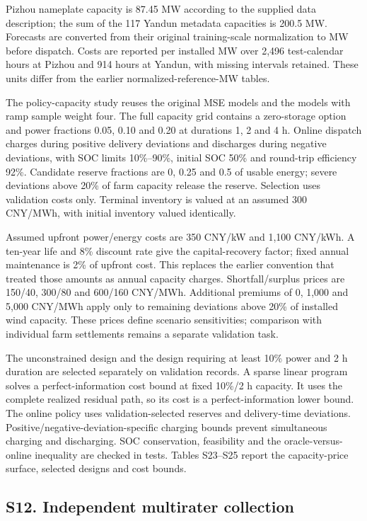 \documentclass[a4paper,11pt]{article}
\begin{document}
Pizhou nameplate capacity is 87.45 MW according to the supplied data description; the sum of the 117 Yandun metadata capacities is 200.5 MW. Forecasts are converted from their original training-scale normalization to MW before dispatch. Costs are reported per installed MW over 2,496 test-calendar hours at Pizhou and 914 hours at Yandun, with missing intervals retained. These units differ from the earlier normalized-reference-MW tables.

The policy-capacity study reuses the original MSE models and the models with ramp sample weight four. The full capacity grid contains a zero-storage option and power fractions 0.05, 0.10 and 0.20 at durations 1, 2 and 4 h. Online dispatch charges during positive delivery deviations and discharges during negative deviations, with SOC limits 10\%--90\%, initial SOC 50\% and round-trip efficiency 92\%. Candidate reserve fractions are 0, 0.25 and 0.5 of usable energy; severe deviations above 20\% of farm capacity release the reserve. Selection uses validation costs only. Terminal inventory is valued at an assumed 300 CNY/MWh, with initial inventory valued identically.

Assumed upfront power/energy costs are 350 CNY/kW and 1,100 CNY/kWh. A ten-year life and 8\% discount rate give the capital-recovery factor; fixed annual maintenance is 2\% of upfront cost. This replaces the earlier convention that treated those amounts as annual capacity charges. Shortfall/surplus prices are 150/40, 300/80 and 600/160 CNY/MWh. Additional premiums of 0, 1,000 and 5,000 CNY/MWh apply only to remaining deviations above 20\% of installed wind capacity. These prices define scenario sensitivities; comparison with individual farm settlements remains a separate validation task.

The unconstrained design and the design requiring at least 10\% power and 2 h duration are selected separately on validation records. A sparse linear program solves a perfect-information cost bound at fixed 10\%/2 h capacity. It uses the complete realized residual path, so its cost is a perfect-information lower bound. The online policy uses validation-selected reserves and delivery-time deviations. Positive/negative-deviation-specific charging bounds prevent simultaneous charging and discharging. SOC conservation, feasibility and the oracle-versus-online inequality are checked in tests. Tables S23--S25 report the capacity-price surface, selected designs and cost bounds.

\subsection{S12. Independent multirater collection}\label{s12.-independent-multirater-collection}
\end{document}
